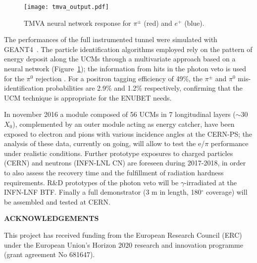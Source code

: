 \documentclass[12pt]{article}
\def\Acknowledgements{\bigskip  \bigskip \begin{center} \begin{large}
             \bf ACKNOWLEDGEMENTS \end{large}\end{center}}
\begin{document}
\begin{figure}[htb]
\centering
\texttt{[image: tmva\_output.pdf]}
\caption{TMVA \cite{tmva} neural network response for $\pi^{\pm}$ (red) and $e^+$ (blue).}
\label{fig:tmva}
\end{figure}


The performances of the full instrumented tunnel were simulated with GEANT4~\cite{geant}. The particle identification
algorithms employed rely on the pattern of energy deposit along the UCMs through a multivariate approach based on a neural
network (Figure~\ref{fig:tmva}); the information from hits in the photon veto is used for the $\pi^0$ rejection
\cite{analysis}. For a positron tagging efficiency of 49\%, the $\pi^{\pm}$ and $\pi^0$ mis-identification probabilities are
2.9\% and 1.2\% respectively, confirming that the UCM technique is appropriate for the ENUBET needs.

In november 2016 a module composed of 56 UCMs in 7 longitudinal layers ($\sim$30 $X_0$), complemented by an outer module
acting as energy catcher, have been exposed to electron and pions with various
incidence angles at the CERN-PS; the analysis of these data, currently on going, will allow
to test the e/$\pi$ performance under realistic conditions. 
Further prototype exposures to charged particles (CERN) and neutrons (INFN-LNL CN) are foreseen during
2017-2018, 
in order to also assess the recovery time and the fulfillment of radiation hardness requirements. 
R\&D prototypes of the photon veto will be $\gamma$-irradiated at the INFN-LNF BTF.
Finally a full demonstrator (3 m in length, 180$^\circ$ coverage) will be assembled and tested at CERN.






\Acknowledgements
This project has received funding from the European Research Council (ERC) under the European Union's
Horizon 2020 research and innovation programme (grant agreement No 681647).
\end{document}
